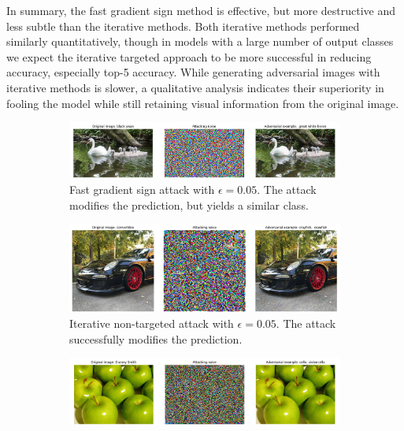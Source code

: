 \documentclass[]{article}
\begin{document}
In summary, the fast gradient sign method is effective, but more destructive and less subtle than the iterative methods. Both iterative methods performed similarly quantitatively, though in models with a large number of output classes we expect the iterative targeted approach to be more successful in reducing accuracy, especially top-5 accuracy. While generating adversarial images with iterative methods is slower, a qualitative analysis indicates their superiority in fooling the model while still retaining visual information from the original image.

\begin{figure}
    \centering
    \begin{subfigure}{0.9\textwidth}
        \includegraphics[width=\linewidth]{adv_05_fgsm.png}
        \caption{Fast gradient sign attack with $\epsilon=0.05$. The attack modifies the prediction, but yields a similar class.}
        \label{fig:adv_fgsm}
    \end{subfigure}
    \begin{subfigure}{0.89\textwidth}
        \includegraphics[width=\linewidth]{adv_05_non.png}
        \caption{Iterative non-targeted attack with $\epsilon=0.05$. The attack successfully modifies the prediction.}
        \label{fig:adv_05_non}
    \end{subfigure}
    \begin{subfigure}{0.9\textwidth}
        \includegraphics[width=\linewidth]{adv_02_targ.png}

\end{subfigure}
\end{figure}
\end{document}

